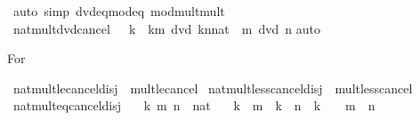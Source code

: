 \begin{isabellebody}
%
\isadelimproof
%
\endisadelimproof
%
\isatagproof
{}\isamarkupfalse%
\ {\isacharparenleft}{\kern0pt}auto\ simp{\isacharcolon}{\kern0pt}\ dvd{\isacharunderscore}{\kern0pt}eq{\isacharunderscore}{\kern0pt}mod{\isacharunderscore}{\kern0pt}eq{\isacharunderscore}{\kern0pt}{}\ mod{\isacharunderscore}{\kern0pt}mult{\isacharunderscore}{\kern0pt}mult{}{\isacharparenright}{\kern0pt}%
\endisatagproof
{\isafoldproof}%
%
\isadelimproof
\isanewline
%
\endisadelimproof
\isanewline
{}\isamarkupfalse%
\ nat{\isacharunderscore}{\kern0pt}mult{\isacharunderscore}{\kern0pt}dvd{\isacharunderscore}{\kern0pt}cancel{}{\isacharcolon}{\kern0pt}\ {\isachardoublequoteopen}{}\ {\isacharless}{\kern0pt}\ k\ {\isasymLongrightarrow}\ {\isacharparenleft}{\kern0pt}k{\isacharasterisk}{\kern0pt}m{\isacharparenright}{\kern0pt}\ dvd\ {\isacharparenleft}{\kern0pt}k{\isacharasterisk}{\kern0pt}n{\isacharcolon}{\kern0pt}{\isacharcolon}{\kern0pt}nat{\isacharparenright}{\kern0pt}\ {\isacharequal}{\kern0pt}\ {\isacharparenleft}{\kern0pt}m\ dvd\ n{\isacharparenright}{\kern0pt}{\isachardoublequoteclose}\isanewline
%
\isadelimproof
%
\endisadelimproof
%
\isatagproof
{}\isamarkupfalse%
{\isacharparenleft}{\kern0pt}auto{\isacharparenright}{\kern0pt}%
\endisatagproof
{\isafoldproof}%
%
\isadelimproof
%
\endisadelimproof
%
\begin{isamarkuptext}%
For %
\end{isamarkuptext}\isamarkuptrue%
\isamarkupfalse%
\ nat{\isacharunderscore}{\kern0pt}mult{\isacharunderscore}{\kern0pt}le{\isacharunderscore}{\kern0pt}cancel{\isacharunderscore}{\kern0pt}disj\ {\isacharequal}{\kern0pt}\ mult{\isacharunderscore}{\kern0pt}le{\isacharunderscore}{\kern0pt}cancel{}\isanewline
\isanewline
{}\isamarkupfalse%
\ nat{\isacharunderscore}{\kern0pt}mult{\isacharunderscore}{\kern0pt}less{\isacharunderscore}{\kern0pt}cancel{\isacharunderscore}{\kern0pt}disj\ {\isacharequal}{\kern0pt}\ mult{\isacharunderscore}{\kern0pt}less{\isacharunderscore}{\kern0pt}cancel{}\isanewline
\isanewline
{}\isamarkupfalse%
\ nat{\isacharunderscore}{\kern0pt}mult{\isacharunderscore}{\kern0pt}eq{\isacharunderscore}{\kern0pt}cancel{\isacharunderscore}{\kern0pt}disj{\isacharcolon}{\kern0pt}\isanewline
\ \ \ k\ m\ n\ {\isacharcolon}{\kern0pt}{\isacharcolon}{\kern0pt}\ nat\isanewline
\ \ \ {\isachardoublequoteopen}k\ {\isacharasterisk}{\kern0pt}\ m\ {\isacharequal}{\kern0pt}\ k\ {\isacharasterisk}{\kern0pt}\ n\ {\isasymlongleftrightarrow}\ k\ {\isacharequal}{\kern0pt}\ {}\ {\isasymor}\ m\ {\isacharequal}{\kern0pt}\ n{\isachardoublequoteclose}\isanewline

\end{isabellebody}
